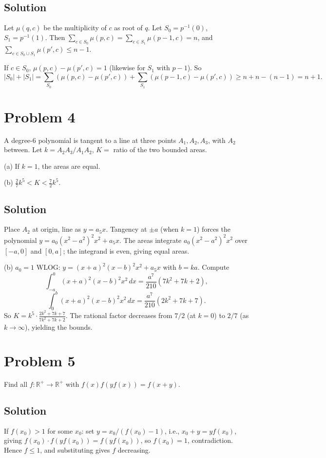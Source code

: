 \documentclass{article}
\begin{document}
\subsection*{Solution}
Let $\mu(q,c)$ be the multiplicity of $c$ as root of $q$. Let $S_0=p^{-1}(0)$, $S_1=p^{-1}(1)$. Then $\sum_{c\in S_0}\mu(p,c) = \sum_{c\in S_1}\mu(p-1,c) = n$, and $\sum_{c\in S_0\cup S_1}\mu(p',c) \le n-1$.

If $c\in S_0$, $\mu(p,c)-\mu(p',c)=1$ (likewise for $S_1$ with $p-1$). So
\[|S_0|+|S_1| = \sum_{S_0}(\mu(p,c)-\mu(p',c)) + \sum_{S_1}(\mu(p-1,c)-\mu(p',c)) \ge n+n-(n-1) = n+1.\]

\section*{Problem 4}
A degree-6 polynomial is tangent to a line at three points $A_1, A_2, A_3$, with $A_2$ between. Let $k=A_2A_3/A_1A_2$, $K=$ ratio of the two bounded areas.

(a) If $k=1$, the areas are equal.

(b) $\frac{2}{7}k^5 < K < \frac{7}{2}k^5$.

\subsection*{Solution}
Place $A_2$ at origin, line as $y=a_5 x$. Tangency at $\pm a$ (when $k=1$) forces the polynomial $y = a_0(x^2-a^2)^2 x^2 + a_5 x$. The areas integrate $a_0(x^2-a^2)^2 x^2$ over $[-a,0]$ and $[0,a]$; the integrand is even, giving equal areas.

(b) $a_0=1$ WLOG: $y=(x+a)^2(x-b)^2 x^2 + a_5 x$ with $b=ka$. Compute
\[\int_{-a}^0 (x+a)^2(x-b)^2 x^2\,dx = \frac{a^7}{210}(7k^2+7k+2),\]
\[\int_0^b (x+a)^2(x-b)^2 x^2\,dx = \frac{a^7}{210}(2k^2+7k+7).\]
So $K = k^5\cdot \frac{2k^2+7k+7}{7k^2+7k+2}$. The rational factor decreases from $7/2$ (at $k=0$) to $2/7$ (as $k\to\infty$), yielding the bounds.

\section*{Problem 5}
Find all $f:\mathbb{R}^+\to\mathbb{R}^+$ with $f(x)f(yf(x))=f(x+y)$.

\subsection*{Solution}
If $f(x_0)>1$ for some $x_0$: set $y=x_0/(f(x_0)-1)$, i.e., $x_0+y = yf(x_0)$, giving $f(x_0)\cdot f(yf(x_0))=f(yf(x_0))$, so $f(x_0)=1$, contradiction. Hence $f\le 1$, and substituting gives $f$ decreasing.
\end{document}

